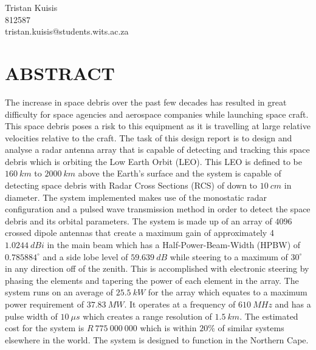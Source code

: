\documentclass[11pt]{witseiepaper}
\begin{document}
\begin{bibunit}[witseie]
\begin{center}
\vspace{2cm}
{\Large Tristan Kuisis} \\
{\small 812587} \\
{\small tristan.kuisis@students.wits.ac.za}
\end{center}

\section*{ABSTRACT}
The increase in space debris over the past few decades has resulted in great difficulty for space agencies and aerospace companies while launching space craft. This space debris poses a risk to this equipment as it is travelling at large relative velocities relative to the craft.
The task of this design report is to design and analyse a radar antenna array that is capable of detecting and tracking this space debris which is orbiting the Low Earth Orbit (LEO). This LEO is defined to be $160~km$ to $2000~km$ above the Earth's surface and the system is capable of detecting space debris with Radar Cross Sections (RCS) of down to $10~cm$ in diameter.
The system implemented makes use of the monostatic radar configuration and a pulsed wave transmission method in order to detect the space debris and its orbital parameters.
The system is made up of an array of $4096$ crossed dipole antennas that create a maximum gain of approximately 4$1.0244~dBi$ in the main beam which has a Half-Power-Beam-Width (HPBW) of $0.785884^{\circ}$ and a side lobe level of $59.639~dB$ while steering to a maximum of $30^{\circ}$ in any direction off of the zenith. This is accomplished with electronic steering by phasing the elements and tapering the power of each element in the array.
The system runs on an average of $25.5~kW$ for the array which equates to a maximum power requirement of $37.83~MW$. It operates at a frequency of $610~MHz$ and has a pulse width of $10~\mu s$ which creates a range resolution of $1.5~km$.
The estimated cost for the system is $R~775~000~000$ which is within $20\%$ of similar systems elsewhere in the world. The system is designed to function in the Northern Cape.


\clearpage


\clearpage

\tableofcontents

\listoffigures

\listoftables

\onecolumn
\clearpage
{}



\end{bibunit}
\end{document}
